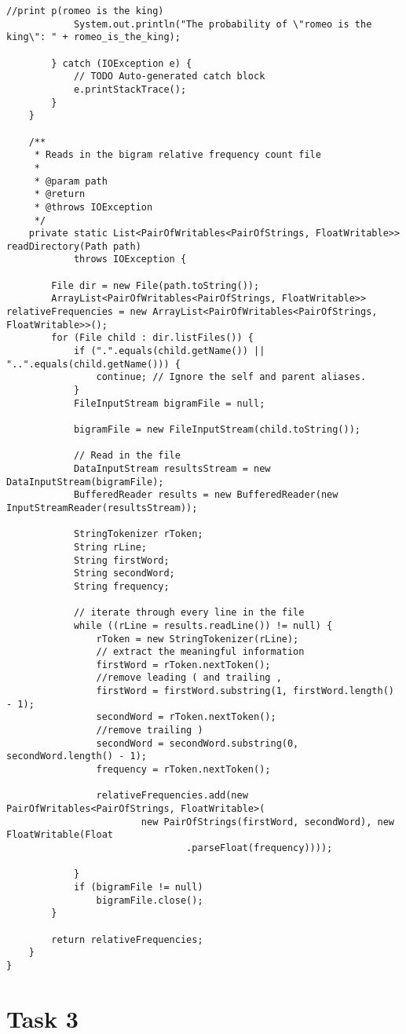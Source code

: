 \documentclass{article} %
\begin{document}
\begin{lstlisting}[style=Java]
			//print p(romeo is the king)
			System.out.println("The probability of \"romeo is the king\": " + romeo_is_the_king);
			
		} catch (IOException e) {
			// TODO Auto-generated catch block
			e.printStackTrace();
		}
	}

	/**
	 * Reads in the bigram relative frequency count file
	 * 
	 * @param path
	 * @return
	 * @throws IOException
	 */
	private static List<PairOfWritables<PairOfStrings, FloatWritable>> readDirectory(Path path)
			throws IOException {

		File dir = new File(path.toString());
		ArrayList<PairOfWritables<PairOfStrings, FloatWritable>> relativeFrequencies = new ArrayList<PairOfWritables<PairOfStrings, FloatWritable>>();
		for (File child : dir.listFiles()) {
			if (".".equals(child.getName()) || "..".equals(child.getName())) {
				continue; // Ignore the self and parent aliases.
			}
			FileInputStream bigramFile = null;

			bigramFile = new FileInputStream(child.toString());

			// Read in the file
			DataInputStream resultsStream = new DataInputStream(bigramFile);
			BufferedReader results = new BufferedReader(new InputStreamReader(resultsStream));

			StringTokenizer rToken;
			String rLine;
			String firstWord;
			String secondWord;
			String frequency;

			// iterate through every line in the file
			while ((rLine = results.readLine()) != null) {
				rToken = new StringTokenizer(rLine);
				// extract the meaningful information
				firstWord = rToken.nextToken();
				//remove leading ( and trailing ,
				firstWord = firstWord.substring(1, firstWord.length() - 1);
				secondWord = rToken.nextToken();
				//remove trailing )
				secondWord = secondWord.substring(0, secondWord.length() - 1);
				frequency = rToken.nextToken();

				relativeFrequencies.add(new PairOfWritables<PairOfStrings, FloatWritable>(
						new PairOfStrings(firstWord, secondWord), new FloatWritable(Float
								.parseFloat(frequency))));

			}
			if (bigramFile != null)
				bigramFile.close();
		}

		return relativeFrequencies;
	}
}
\end{lstlisting}

\section*{Task 3}
\end{document}
